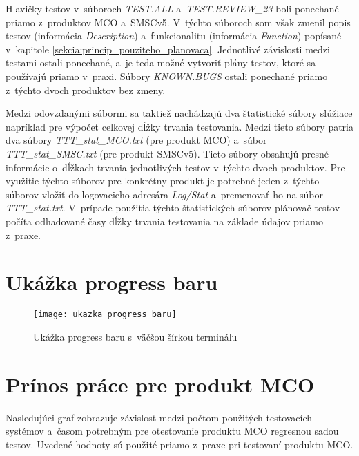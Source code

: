 Hlavičky testov v~súboroch \textit{TEST.ALL} a~\textit{TEST.REVIEW\_23} 
boli ponechané priamo z~produktov MCO a~SMSCv5. V~týchto súboroch som 
však zmenil popis testov (informácia \textit{Description}) 
a~funkcionalitu (informácia \textit{Function}) popísané v~kapitole 
\ref{sekcia:princip_pouziteho_planovaca}.
Jednotlivé závislosti medzi testami ostali ponechané, a~je teda možné 
vytvoriť plány testov, ktoré sa používajú priamo v~praxi.
Súbory \textit{KNOWN.BUGS} ostali ponechané priamo z~týchto dvoch 
produktov bez zmeny. 

Medzi odovzdanými súbormi sa taktiež nachádzajú dva štatistické súbory 
slúžiace napríklad pre výpočet celkovej dĺžky trvania testovania. 
Medzi tieto súbory patria dva súbory \textit{TTT\_stat\_MCO.txt} (pre produkt MCO) 
a~súbor \textit{TTT\_stat\_SMSC.txt} (pre produkt SMSCv5).
Tieto súbory obsahujú presné informácie o~dĺžkach trvania jednotlivých 
testov v~týchto dvoch produktov. 
Pre využitie týchto súborov pre konkrétny produkt je potrebné jeden 
z~týchto súborov vložiť do logovacieho adresára \textit{Log/Stat} 
a~premenovať ho na súbor \textit{TTT\_stat.txt}.
V~prípade použitia týchto štatistických súborov plánovač testov počíta
odhadované časy dĺžky trvania testovania na základe údajov priamo z~praxe.



%
%
\chapter{Ukážka progress baru}
\label{priloha:ukazka_progress_baru}
\begin{figure}[h]
  \begin{center}
    \texttt{[image: ukazka\_progress\_baru]} 
    \caption{Ukážka progress baru s~väčšou šírkou terminálu}
  \end{center}
\end{figure}



%
%
\chapter{Prínos práce pre produkt MCO}
\label{priloha:graf_mco}
Nasledujúci graf zobrazuje závislosť medzi počtom použitých testovacích
systémov a~časom potrebným pre otestovanie produktu MCO regresnou 
sadou testov.
Uvedené hodnoty sú použité priamo z~praxe pri testovaní produktu MCO.


